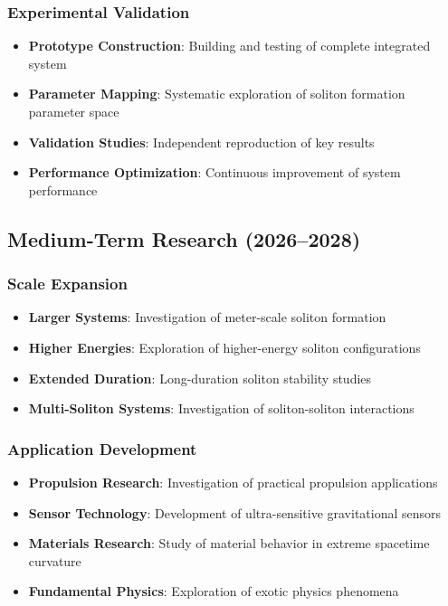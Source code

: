 \documentclass[10pt,twocolumn]{article}
\begin{document}
\subsubsection{Experimental Validation}
\begin{itemize}
\item \textbf{Prototype Construction}: Building and testing of complete integrated system
\item \textbf{Parameter Mapping}: Systematic exploration of soliton formation parameter space
\item \textbf{Validation Studies}: Independent reproduction of key results
\item \textbf{Performance Optimization}: Continuous improvement of system performance
\end{itemize}

\subsection{Medium-Term Research (2026--2028)}

\subsubsection{Scale Expansion}
\begin{itemize}
\item \textbf{Larger Systems}: Investigation of meter-scale soliton formation
\item \textbf{Higher Energies}: Exploration of higher-energy soliton configurations
\item \textbf{Extended Duration}: Long-duration soliton stability studies
\item \textbf{Multi-Soliton Systems}: Investigation of soliton-soliton interactions
\end{itemize}

\subsubsection{Application Development}
\begin{itemize}
\item \textbf{Propulsion Research}: Investigation of practical propulsion applications
\item \textbf{Sensor Technology}: Development of ultra-sensitive gravitational sensors
\item \textbf{Materials Research}: Study of material behavior in extreme spacetime curvature
\item \textbf{Fundamental Physics}: Exploration of exotic physics phenomena
\end{itemize}
\end{document}
